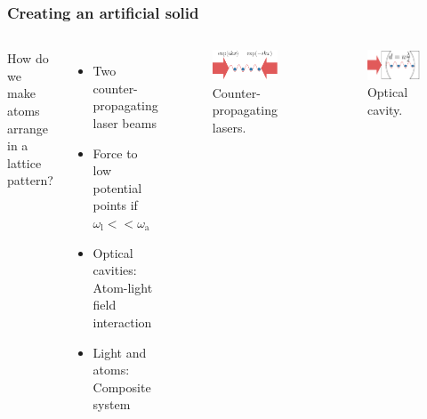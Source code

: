 \documentclass[pdflatex,compress]{beamer}
\begin{document}
\begin{frame}
\frametitle{Creating an artificial solid}
\begin{columns}
How do we make atoms arrange in a lattice pattern?
\begin{itemize}
	\item Two counter-propagating laser beams
	\item Force to low potential points if $\omega_\text{l} << \omega_\text{a}$
	\item Optical cavities: Atom-light field interaction
	\item Light and atoms: Composite system
\end{itemize}
\begin{figure}
\centering
\includegraphics[width=.6\textwidth]{images/counter_propagating.eps}
\vspace*{-5mm}
\caption{Counter-propagating lasers.}
\end{figure}
\vspace{-1.5em}
\begin{figure}
\centering
\includegraphics[width=.6\textwidth]{images/cavity.eps}
\vspace*{-5mm}
\caption{Optical cavity.}
\end{figure}
\end{columns}
\end{frame}
\end{document}
